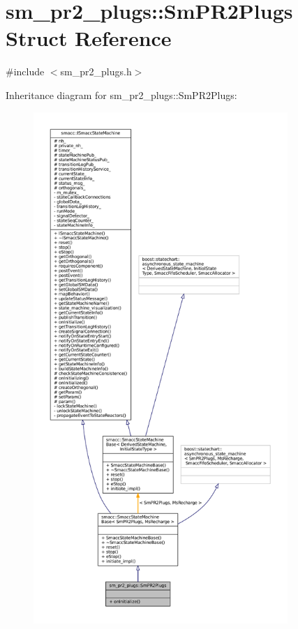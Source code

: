 \hypertarget{structsm__pr2__plugs_1_1SmPR2Plugs}{}\section{sm\+\_\+pr2\+\_\+plugs\+:\+:Sm\+P\+R2\+Plugs Struct Reference}
\label{structsm__pr2__plugs_1_1SmPR2Plugs}


{\ttfamily \#include $<$sm\+\_\+pr2\+\_\+plugs.\+h$>$}



Inheritance diagram for sm\+\_\+pr2\+\_\+plugs\+:\+:Sm\+P\+R2\+Plugs\+:
\nopagebreak
\begin{figure}[H]
\begin{center}
\leavevmode
\includegraphics[height=550pt]{structsm__pr2__plugs_1_1SmPR2Plugs__inherit__graph}
\end{center}
\end{figure}



